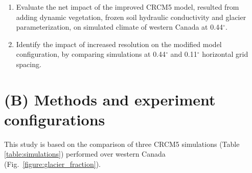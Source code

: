 \documentclass[a0b,landscape]{a0poster}
\begin{document}
\begin{multicols*}{4}
\vspace{1cm}
\begin{tcolorbox}[colback=white,colframe=green!40!black,adjusted title={Main objectives}]
  \begin{enumerate}
  \item Evaluate the net impact of the improved CRCM5 model, resulted from adding
        dynamic vegetation, frozen soil hydraulic conductivity and glacier
        parameterization, on simulated climate of western Canada at 0.44$^\circ$.
  \item Identify the impact of increased resolution on the modified model configuration,
        by comparing simulations at 0.44$^\circ$ and 0.11$^\circ$ horizontal grid
        spacing.
  \end{enumerate}
\end{tcolorbox}


\section*{(B) Methods and experiment configurations}
%
This study is based on the comparison of three CRCM5 simulations (Table \ref{table:simulations}) performed over western Canada (Fig.~\ref{figure:glacier_fraction}).\\[1cm]
%


\end{multicols*}
\end{document}
